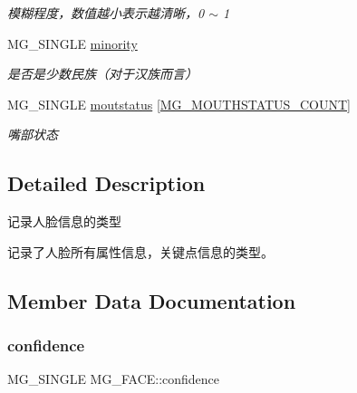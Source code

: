 \begin{DoxyCompactItemize}
\begin{DoxyCompactList}\small\item\em 模糊程度，数值越小表示越清晰，0 $\sim$ 1 \end{DoxyCompactList}\item 
\mbox{\label{struct_m_g___f_a_c_e_a6f06b722a0a917a63cf8f2b0c2ee8765}} 
M\+G\+\_\+\+S\+I\+N\+G\+LE \hyperlink{struct_m_g___f_a_c_e_a6f06b722a0a917a63cf8f2b0c2ee8765}{minority}
\begin{DoxyCompactList}\small\item\em 是否是少数民族（对于汉族而言） \end{DoxyCompactList}\item 
\mbox{\label{struct_m_g___f_a_c_e_a6dd8696e698351c35ebaa0a237f8da62}} 
M\+G\+\_\+\+S\+I\+N\+G\+LE \hyperlink{struct_m_g___f_a_c_e_a6dd8696e698351c35ebaa0a237f8da62}{moutstatus} \mbox{[}\hyperlink{_m_g___common_8h_afb9b4e071d6e3a778e82fd24ee21c02ba0e4a9c1f6b20f96ceda0bb3ace5044ec}{M\+G\+\_\+\+M\+O\+U\+T\+H\+S\+T\+A\+T\+U\+S\+\_\+\+C\+O\+U\+NT}\mbox{]}
\begin{DoxyCompactList}\small\item\em 嘴部状态 \end{DoxyCompactList}\end{DoxyCompactItemize}


\subsection{Detailed Description}
记录人脸信息的类型 

记录了人脸所有属性信息，关键点信息的类型。 

\subsection{Member Data Documentation}
\mbox{\label{struct_m_g___f_a_c_e_ab61f801c8d14f8686654facb639bb763}} 
\subsubsection{\texorpdfstring{confidence}{confidence}}
{\footnotesize\ttfamily M\+G\+\_\+\+S\+I\+N\+G\+LE M\+G\+\_\+\+F\+A\+C\+E\+::confidence}

